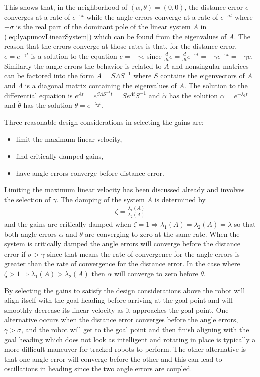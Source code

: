 This shows that, in the neighborhood of $(\alpha, \theta)=(0, 0)$, the distance error $e$ converges at a rate of $e^{-\gamma t}$ while the angle errors converge at a rate of $e^{-\sigma t}$ where $-\sigma$ is the real part of the dominant pole of the linear system $A$ in (\ref{eq:lyapunovLinearSystem}) which can be found from the eigenvalues of $A$. The reason that the errors converge at those rates is that, for the distance error, $e=e^{-\gamma t}$ is a solution to the equation $\dot{e}=-\gamma e$ since $\tfrac{d}{dt}e=\tfrac{d}{dt}e^{-\gamma t} = -\gamma e^{-\gamma t}=-\gamma e$. Similarly the angle errors the behavior is related to $A$ and nonsingular matrices can be factored into the form $A=S\Lambda S^{-1}$ where $S$ contains the eigenvectors of $A$ and $\Lambda$ is a diagonal matrix containing the eigenvalues of $A$. The solution to the differential equation is $e^{At}=e^{S\Lambda S^{-1}t}=Se^{\Lambda t}S^{-1}$ and $\dot{\alpha}$ has the solution $\alpha=e^{-\lambda_1 t}$ and $\dot{\theta}$ has the solution $\theta=e^{-\lambda_2 t}$.

Three reasonable design considerations in selecting the gains are:
\begin{itemize}
\item limit the maximum linear velocity,
\item find critically damped gains,
\item have angle errors converge before distance error.
\end{itemize}
Limiting the maximum linear velocity has been discussed already and involves the selection of $\gamma$. The damping of the system $A$ is determined by
\begin{align*}
\zeta = \frac{\lambda_1(A)}{\lambda_2(A)}
\end{align*}
and the gains are critically damped when $\zeta = 1 \Rightarrow \lambda_1(A)=\lambda_2(A)=\lambda$ so that both angle errors $\alpha$ and $\theta$ are converging to zero at the same rate. When the system is critically damped the angle errors will converge before the distance error if $\sigma>\gamma$ since that means the rate of convergence for the angle errors is greater than the rate of convergence for the distance error. In the case where $\zeta > 1 \Rightarrow \lambda_1(A) > \lambda_2(A)$ then $\alpha$ will converge to zero before $\theta$.

By selecting the gains to satisfy the design considerations above the robot will align itself with the goal heading before arriving at the goal point and will smoothly decrease its linear velocity as it approaches the goal point. One alternative occurs when the distance error converges before the angle errors, $\gamma>\sigma$, and the robot will get to the goal point and then finish aligning with the goal heading which does not look as intelligent and rotating in place is typically a more difficult maneuver for tracked robots to perform. The other alternative is that one angle error will converge before the other and this can lead to oscillations in heading since the two angle errors are coupled.

